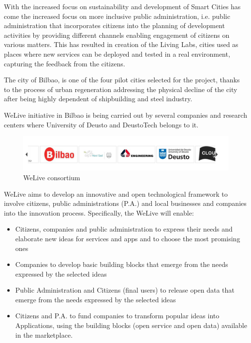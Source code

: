 \documentclass{DeustoFDP}
\begin{document}
With the increased focus on sustainability and development of Smart Cities has come the increased focus on more inclusive public administration, i.e. public administration that incorporates citizens into the planning of development activities by providing different channels enabling engagement of citizens on various matters. This has resulted in creation of the Living Labs, cities used as places where new services can be deployed and tested in a real environment, capturing the feedback from the citizens.

The city of Bilbao, is one of the four pilot cities selected for the project, thanks to the process of urban regeneration addressing the physical decline of the city after being highly dependent of shipbuilding and steel industry.

WeLive initiative in Bilbao is being carried out by several companies and research centers where University of Deusto and DeustoTech belongs to it.

\begin{figure}[h!]
\centering
\includegraphics[width=0.9\linewidth]{fig/weliveconsortium}
\caption[WeLive consortium]{WeLive consortium}
\label{fig:weliveconsortium}
\end{figure}


WeLive aims to develop an innovative and open technological framework to involve citizens, public administrations (P.A.) and local businesses and companies into the innovation process. Specifically, the WeLive will enable:
\begin{itemize}
	\item Citizens, companies and public administration to express their needs and elaborate new ideas for services and apps and to choose the most promising ones
	\item Companies to develop basic building blocks that emerge from the needs expressed by the selected ideas
	\item Public Administration and Citizens (final users) to release open data that emerge from the needs expressed by the selected ideas
	\item Citizens and P.A. to fund companies to transform popular ideas into Applications, using the building blocks (open service and open data) available in the marketplace.
\end{itemize}
\end{document}
